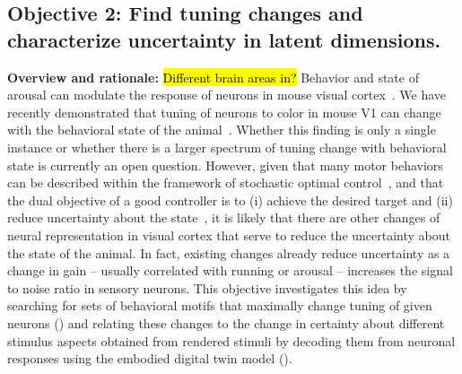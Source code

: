 \documentclass[B2,COG]{ercgrant}
\begin{document}
\subsection{\colorbox{obj2}{\color{white}Objective 2}: Find tuning changes and characterize uncertainty in latent dimensions.}

\label{sub:obj2}

\textbf{Overview and rationale:} 
\hl{Different brain areas in?}
Behavior and state of arousal can modulate the response of neurons in mouse visual cortex~\parencite{Niell2010-bs, Stringer2019-lt, Musall2019-kd}.
We have recently demonstrated that tuning of neurons to color in mouse V1 can change with the behavioral state of the animal~\parencite{Franke2022-do}.
Whether this finding is only a single instance or whether there is a larger spectrum of tuning change with behavioral state is currently an open question. 
However, given that many motor behaviors can be described within the framework of stochastic optimal control~\parencite{Todorov2004-yb}, and that the dual objective of a good controller is to (i) achieve the desired target and (ii) reduce uncertainty about the state~\parencite{Patchell1971-zk}, it is likely that there are other changes of neural representation in visual cortex that serve to reduce the uncertainty about the state of the animal. 
In fact, existing changes already reduce uncertainty as a change in gain -- usually correlated with running or arousal -- increases the signal to noise ratio in sensory neurons. 
This objective investigates this idea by searching for sets of behavioral motifs that maximally change tuning of given neurons () and relating these changes to the change in certainty about different stimulus aspects obtained from rendered stimuli by decoding them from neuronal responses using the embodied digital twin model ().




\end{document}
